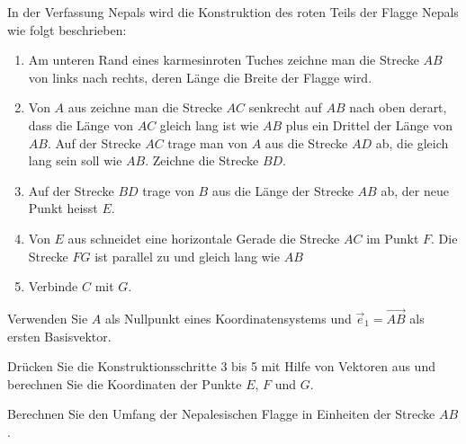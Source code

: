 In der Verfassung Nepals wird die Konstruktion des roten Teils der
Flagge Nepals wie folgt beschrieben:
\begin{enumerate}
\item Am unteren Rand eines karmesinroten Tuches zeichne man die Strecke
$AB$ von links nach rechts, deren Länge die Breite der Flagge wird.
\item Von $A$ aus zeichne man die Strecke $AC$ senkrecht auf $AB$ nach
oben derart, dass die Länge von $AC$ gleich lang ist wie $AB$ plus
ein Drittel der Länge von $AB$.
Auf der Strecke $AC$ trage man von $A$ aus die Strecke $AD$ ab, die
gleich lang sein soll wie $AB$.
Zeichne die Strecke $BD$.
\item Auf der Strecke $BD$ trage von $B$ aus die Länge der Strecke $AB$ ab,
der neue Punkt heisst $E$.
\item Von $E$ aus schneidet eine horizontale Gerade die Strecke $AC$ im
Punkt $F$.
Die Strecke $FG$ ist parallel zu und gleich lang wie $AB$
\item Verbinde $C$ mit $G$.
\end{enumerate}
\begin{center}
\qquad
\qquad
\qquad
{}
\end{center}
Verwenden Sie $A$ als Nullpunkt eines Koordinatensystems und
$\vec{e}_1=\overrightarrow{AB}$
als ersten Basisvektor.
\begin{teilaufgaben}
\item
Drücken Sie die Konstruktionsschritte 3 bis 5 mit Hilfe von Vektoren aus
und berechnen Sie die Koordinaten der Punkte $E$, $F$ und $G$.
\item
Berechnen Sie den Umfang der Nepalesischen Flagge in Einheiten der Strecke
$AB$.
\end{teilaufgaben}


